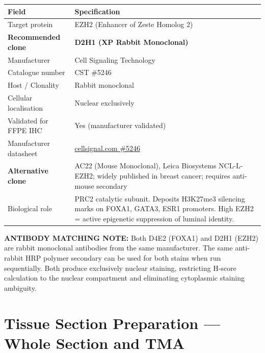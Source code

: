 \documentclass[11pt, a4paper]{article}
\begin{document}
\begin{center}
\begin{tabular}{p{4.5cm}p{9cm}}
\toprule
\textbf{Field} & \textbf{Specification} \\
\midrule
Target protein &
EZH2 (Enhancer of Zeste Homolog 2) \\[0.3em]
\textbf{Recommended clone} &
\textbf{D2H1 (XP Rabbit Monoclonal)} \\[0.3em]
Manufacturer &
Cell Signaling Technology \\[0.3em]
Catalogue number &
CST \#5246 \\[0.3em]
Host / Clonality &
Rabbit monoclonal \\[0.3em]
Cellular localisation &
Nuclear exclusively \\[0.3em]
Validated for FFPE IHC &
Yes (manufacturer validated) \\[0.3em]
Manufacturer datasheet &
\href{https://www.cellsignal.com/products/primary-antibodies/ezh2-d2h1-xp-rabbit-mab/5246}
{cellsignal.com \#5246} \\[0.3em]
\textbf{Alternative clone} &
AC22 (Mouse Monoclonal),
Leica Biosystems NCL-L-EZH2;
widely published in breast cancer;
requires anti-mouse secondary \\[0.3em]
Biological role &
PRC2 catalytic subunit.
Deposits H3K27me3 silencing marks
on FOXA1, GATA3, ESR1 promoters.
High EZH2 = active epigenetic
suppression of luminal identity. \\
\bottomrule
\end{tabular}
\end{center}

\begin{mdframed}[backgroundcolor=protocolbox,
                 linecolor=green!50!black,
                 linewidth=1pt]
\textbf{ANTIBODY MATCHING NOTE:}
Both D4E2 (FOXA1) and D2H1 (EZH2) are rabbit
monoclonal antibodies from the same manufacturer.
The same anti-rabbit HRP polymer secondary can
be used for both stains when run sequentially.
Both produce exclusively nuclear staining,
restricting H-score calculation to the nuclear
compartment and eliminating cytoplasmic staining
ambiguity.
\end{mdframed}

\section{Tissue Section Preparation ---
Whole Section and TMA}
\end{document}

